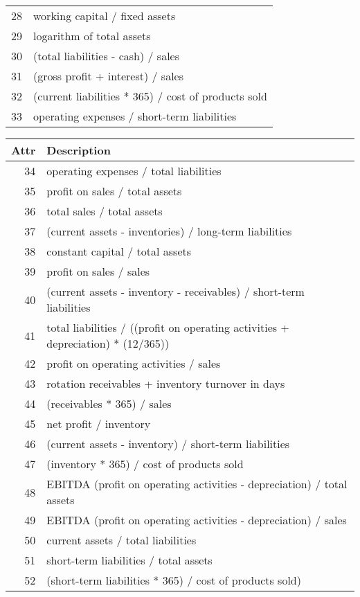 \begin{table*}
\begin{tabular}[t]{|r|p{6cm}| }
    28	&	working capital / fixed assets \\
    29	&	logarithm of total assets \\
    30	&	(total liabilities - cash) / sales \\
    31	&	(gross profit + interest) / sales \\
    32	&	(current liabilities * 365) / cost of products sold \\
    33	&	operating expenses / short-term liabilities \\
     \hline
\end{tabular}
\begin{tabular}[t]{|r|p{6cm}| }
     \hline
     \textbf{Attr} & \textbf{Description} \\
     \hline
    34	&	operating expenses / total liabilities \\
    35	&	profit on sales / total assets \\
    36	&	total sales / total assets \\
    37	&	(current assets - inventories) / long-term liabilities \\
    38	&	constant capital / total assets \\
    39	&	profit on sales / sales \\
    40	&	(current assets - inventory - receivables) / short-term liabilities \\
    41	&	total liabilities / ((profit on operating activities + depreciation) * (12/365)) \\
    42	&	profit on operating activities / sales \\
    43	&	rotation receivables + inventory turnover in days \\
    44	&	(receivables * 365) / sales \\
    45	&	net profit / inventory \\
    46	&	(current assets - inventory) / short-term liabilities \\
    47	&	(inventory * 365) / cost of products sold \\
    48	&	EBITDA (profit on operating activities - depreciation) / total assets \\
    49	&	EBITDA (profit on operating activities - depreciation) / sales \\
    50	&	current assets / total liabilities \\
    51	&	short-term liabilities / total assets \\
    52	&	(short-term liabilities * 365) / cost of products sold) \\

\end{tabular}
\end{table*}
